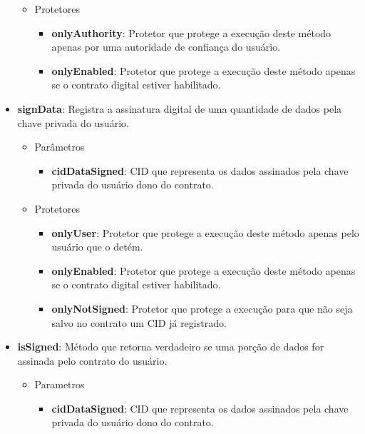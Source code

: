 \documentclass[tcc,capa]{texufpel}
\begin{document}
\begin{itemize}
\begin{itemize}
            \item Protetores
            \begin{itemize}
                \item \textbf{onlyAuthority}: Protetor que protege a execução deste método apenas por uma autoridade de confiança do usuário.
                
                \item \textbf{onlyEnabled}: Protetor que protege a execução deste método apenas se o contrato digital estiver habilitado.
            \end{itemize}
        \end{itemize}
        
        \item \textbf{signData}: Registra a assinatura digital de uma quantidade de dados pela chave privada do usuário.
        \begin{itemize}
            \item Parâmetros
            \begin{itemize}
                \item \textbf{cidDataSigned}: CID que representa os dados assinados pela chave privada do usuário dono do contrato.
            \end{itemize}
            
            \item Protetores
            \begin{itemize}
                \item \textbf{onlyUser}: Protetor que protege a execução deste método apenas pelo usuário que o detém.
                \item \textbf{onlyEnabled}: Protetor que protege a execução deste método apenas se o contrato digital estiver habilitado.
                \item \textbf{onlyNotSigned}: Protetor que protege a execução para que não seja salvo no contrato um CID já registrado.
            \end{itemize}
        \end{itemize}
        
        \item \textbf{isSigned}: Método que retorna verdadeiro se uma porção de dados for assinada pelo contrato do usuário.
        \begin{itemize}
            \item Parametros
            \begin{itemize}
                \item \textbf{cidDataSigned}: CID que representa os dados assinados pela chave privada do usuário dono do contrato.
            \end{itemize}
        \end{itemize}
        

\end{itemize}
\end{document}
